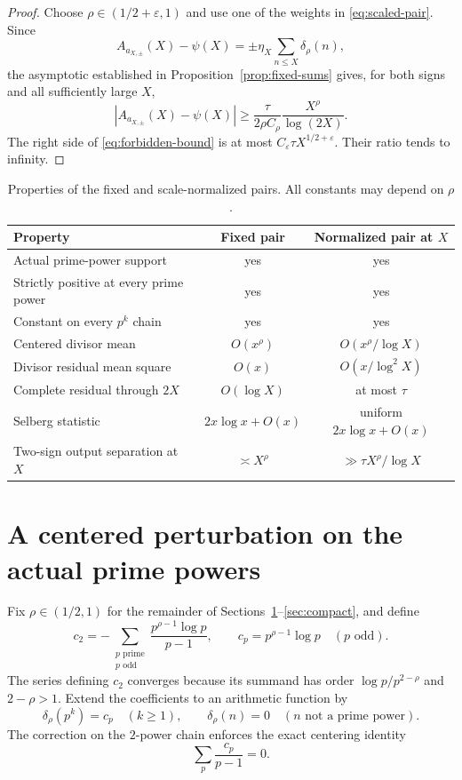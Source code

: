 \documentclass[11pt,a4paper]{amsart}
\theoremstyle{definition}
\newcommand{\1}{\mathbf 1}
\begin{document}
\begin{proof}
Choose $\rho\in(1/2+\varepsilon,1)$ and use one of the weights in \eqref{eq:scaled-pair}.  Since
\[
 A_{a_{X,\pm}}(X)-\psi(X)
 =\pm\eta_X\sum_{n\le X}\delta_\rho(n),
\]
the asymptotic established in Proposition~\ref{prop:fixed-sums} gives, for both signs and all sufficiently large $X$,
\[
 |A_{a_{X,\pm}}(X)-\psi(X)|
 \ge \frac{\tau}{2\rho C_\rho}
       \frac{X^\rho}{\log(2X)}.
\]
The right side of \eqref{eq:forbidden-bound} is at most
$C_\varepsilon\tau X^{1/2+\varepsilon}$.  Their ratio tends to infinity.
\end{proof}

\begin{table}[t]
\centering
\caption{Properties of the fixed and scale-normalized pairs.  All constants may depend on $\rho$.}
\label{tab:comparison}
\small
\begin{tabular}{@{}p{}cc@{}}
\toprule
Property & Fixed pair & Normalized pair at $X$\\
\midrule
Actual prime-power support & yes & yes\\
Strictly positive at every prime power & yes & yes\\
Constant on every $p^k$ chain & yes & yes\\
Centered divisor mean & $O(x^\rho)$ & $O(x^\rho/\log X)$\\
Divisor residual mean square & $O(x)$ & $O(x/\log^2 X)$\\
Complete residual through $2X$ & $O(\log X)$ & at most $\tau$\\
Selberg statistic & $2x\log x+O(x)$ & uniform $2x\log x+O(x)$\\
Two-sign output separation at $X$ & $\asymp X^\rho$ & $\gg \tau X^\rho/\log X$\\
\bottomrule
\end{tabular}
\end{table}

\section{A centered perturbation on the actual prime powers}\label{sec:construction}

Fix $\rho\in(1/2,1)$ for the remainder of Sections~\ref{sec:construction}--\ref{sec:compact}, and define
\begin{equation}\label{eq:c-p}
  c_2=-\sum_{\substack{p\text{ prime}\\p\text{ odd}}}
       \frac{p^{\rho-1}\log p}{p-1},
  \qquad
  c_p=p^{\rho-1}\log p\quad(p\text{ odd}).
\end{equation}
The series defining $c_2$ converges because its summand has order
$\log p/p^{2-\rho}$ and $2-\rho>1$.  Extend the coefficients to an arithmetic function by
\begin{equation}\label{eq:delta}
  \delta_\rho(p^k)=c_p\quad(k\ge1),
  \qquad
  \delta_\rho(n)=0\quad(n\text{ not a prime power}).
\end{equation}
The correction on the $2$-power chain enforces the exact centering identity
\begin{equation}\label{eq:centering}
  \sum_p\frac{c_p}{p-1}=0.
\end{equation}
\end{document}
